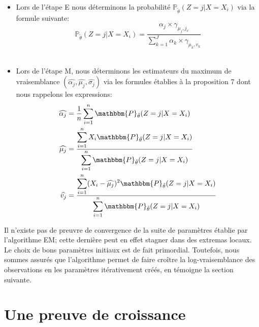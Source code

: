 \documentclass[frenchb]{report}
\newcommand{\1}{\mathbbm{1}}
\newcommand{\prob}{\mathbbm{P}}
\newcommand{\thetat}{\tilde{\theta}}
\theoremstyle{definition}\newtheorem{defn}{Définition}
\theoremstyle{definition}\newtheorem{exm}{Exemple}
\theoremstyle{definition}\newtheorem{nota}{Notation}
\theoremstyle{definition}\newtheorem{rem}{Remarque}
\begin{document}
	\begin{itemize}
		\item Lors de l'étape E nous déterminons la probabilité $\mathbb{P}_{\tilde{\theta}}(Z = j| X = X_i)$ via la formule suivante:
		\[
		\mathbb{P}_{\tilde{\theta}}(Z = j| X = X_i) = \frac{\alpha_j \times \gamma_{\mu_j, j_v}}{\sum_{k=1}^{J} \alpha_k \times \gamma_{\mu_k, v_k}}
		\] \\
		\item Lors de l'étape M, nous déterminons les estimateurs du maximum de vraisemblance $(\widehat{\alpha_j}, \widehat{\mu_j}, \widehat{\sigma_j})$ via les formules établies à la proposition 7 dont nous rappelons les expressions:
		\begin{align*}
			\widehat{\alpha_j} &= \displaystyle\frac{1}{n}\sum_{i=1}^n \prob_{\thetat}(Z=j|X=X_i) \\
			\widehat{\mu_j} &= \displaystyle\frac{\displaystyle\sum_{i=1}^n X_i\prob_{\thetat}(Z=j|X=X_i)}{\displaystyle\sum_{i=1}^n \prob_{\thetat}(Z=j|X=X_i)} \\
			\widehat{v_j} &= \displaystyle\frac{\displaystyle\sum_{i=1}^n (X_i -\widehat{\mu_j})^2 \prob_{\thetat}(Z=j|X=X_i)}{\displaystyle\sum_{i=1}^n\prob_{\thetat}(Z=j|X=X_i)}
		\end{align*}
	\end{itemize}
	\vspace{7mm}
Il n'existe pas de preuvre de convergence de la suite de paramètres établie par l'algorithme EM; cette dernière peut en effet stagner dans des extremas locaux. Le choix de bons paramètres initiaux est de fait primordial. Toutefois, nous sommes assurés que l'algorithme permet de faire croître la log-vraisemblance des observations en les paramètres itérativement créés, en témoigne la section suivante.

\newpage
\section{Une preuve de croissance}
\end{document}
